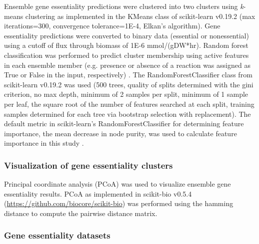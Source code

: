 \documentclass[11pt,twocolumn,notitlepage,openany,twoside]{book}
\begin{document}
\begin{refsection}
Ensemble gene essentiality predictions were clustered into two clusters using \textit{k}-means clustering as implemented in the KMeans class of scikit-learn v0.19.2 \cite{Pedregosa2011-wa} (max iterations=300, convergence tolerance=1E-4, Elkan’s \cite{Elkan2003-du} algorithm). Gene essentiality predictions were converted to binary data (essential or nonessential) using a cutoff of flux through biomass of 1E-6 mmol/(gDW*hr). Random forest classification was performed to predict cluster membership using active features in each ensemble member (e.g. presence or absence of a reaction was assigned as True or False in the input, respectively) \cite{Breiman2001-pl}. The RandomForestClassifier class from scikit-learn v0.19.2 was used (500 trees, quality of splits determined with the gini criterion, no max depth, minimum of 2 samples per split, minimum of 1 sample per leaf, the square root of the number of features searched at each split, training samples determined for each tree via bootstrap selection with replacement). The default metric in scikit-learn’s RandomForestClassifier for determining feature importance, the mean decrease in node purity, was used to calculate feature importance in this study \cite{Gordon1984-iw}.

\subsubsection{Visualization of gene essentiality clusters}

Principal coordinate analysis (PCoA) \cite{Gower1966-xt} was used to visualize ensemble gene essentiality results. PCoA as implemented in scikit-bio v0.5.4 (\url{https://github.com/biocore/scikit-bio}) was performed using the hamming distance \cite{Hamming1950-zv} to compute the pairwise distance matrix.

\subsubsection{Gene essentiality datasets}


\end{refsection}
\end{document}
